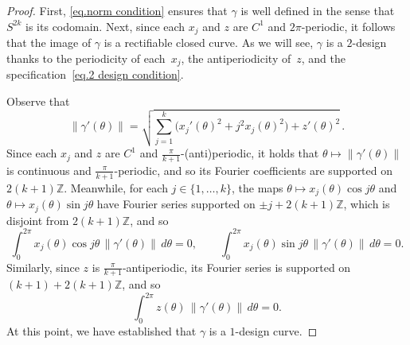 \documentclass[12pt]{article}
\theoremstyle{plain}
\theoremstyle{definition}
\theoremstyle{remark}
\begin{document}
\begin{proof}
First, \eqref{eq.norm condition} ensures that $\gamma$ is well defined in the sense that $S^{2k}$ is its codomain.
Next, since each $x_j$ and $z$ are $C^1$ and $2\pi$-periodic, it follows that the image of $\gamma$ is a rectifiable closed curve.
As we will see, $\gamma$ is a $2$-design thanks to the periodicity of each~$x_j$, the antiperiodicity of~$z$, and the specification~\eqref{eq.2 design condition}.

Observe that
\[
\|\gamma'(\theta)\|
=\sqrt{\sum_{j=1}^k \big(x_j'(\theta)^2+j^2x_j(\theta)^2\big)+z'(\theta)^2}\,.
\]
Since each $x_j$ and $z$ are $C^1$ and $\frac{\pi}{k+1}$-(anti)periodic, it holds that $\theta\mapsto\|\gamma'(\theta)\|$ is continuous and $\frac{\pi}{k+1}$-periodic, and so its Fourier coefficients are supported on $2(k+1)\mathbb{Z}$.
Meanwhile, for each $j\in\{1,\ldots,k\}$, the maps $\theta\mapsto x_j(\theta)\cos j\theta$ and $\theta\mapsto x_j(\theta)\sin j\theta$ have Fourier series supported on $\pm j+2(k+1)\mathbb{Z}$, which is disjoint from $2(k+1)\mathbb{Z}$, and so
\[
\int_0^{2\pi}x_j(\theta)\cos j\theta\,\|\gamma'(\theta)\|\,d\theta=0,
\qquad
\int_0^{2\pi}x_j(\theta)\sin j\theta\,\|\gamma'(\theta)\|\,d\theta=0.
\]
Similarly, since $z$ is $\frac{\pi}{k+1}$-antiperiodic, its Fourier series is supported on $(k+1)+2(k+1)\mathbb{Z}$, and so
\[
\int_0^{2\pi}z(\theta)\,\|\gamma'(\theta)\|\,d\theta=0.
\]
At this point, we have established that $\gamma$ is a $1$-design curve.


\end{proof}
\end{document}
